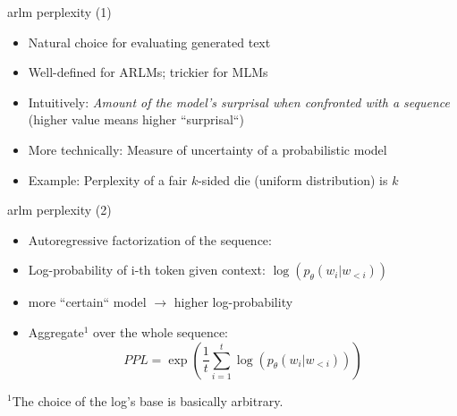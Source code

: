 \begin{frame}{arlm perplexity (1)}

\vfill

\begin{itemize}
	\item Natural choice for evaluating generated text
	\item Well-defined for ARLMs; trickier for MLMs
	\item Intuitively: \textit{Amount of the model's surprisal when confronted with a sequence} (higher value means higher ``surprisal``)
	\item More technically: Measure of uncertainty of a probabilistic model
	\item Example: Perplexity of a fair $k$-sided die (uniform distribution) is $k$
\end{itemize}

\vfill

\end{frame}


\begin{frame}{arlm perplexity (2)}

\vfill
\begin{itemize}
	\item Autoregressive factorization of the sequence:
\end{itemize}

\begin{figure}
    \centering
\end{figure}

\begin{itemize}
	\item Log-probability of i-th token given context: $\log(p_\theta(w_i|w_{<i}))$
	\item[] more ``certain`` model $\to$ higher log-probability
	\item Aggregate$^1$ over the whole sequence:
				$$PPL = \exp\left(\frac{1}{t} \sum_{i=1}^t \log(p_\theta(w_i|w_{<i}))\right)$$
\end{itemize}

\vfill

\footnotesize{$^1$The choice of the log’s base is basically arbitrary.}

\end{frame}

